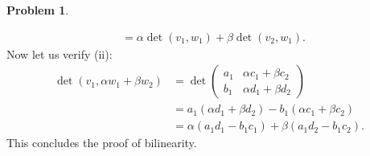 \documentclass[11pt,oneside]{amsart}
\theoremstyle{definition}
\newtheorem{problem}{Problem}
\begin{document}
\begin{problem}
\begin{enumerate}[(a)]
\begin{solution}
\[\begin{split}
                    &= \alpha\det(v_1,w_1)+\beta\det(v_2,w_1).
                \end{split}\]
                Now let us verify (ii):
                \[\begin{split}
                    \det(v_1,\alpha w_1+\beta w_2) &= \det\begin{pmatrix}
                        a_1 & \alpha c_1+\beta c_2\\
                        b_1 & \alpha d_1+\beta d_2
                    \end{pmatrix}\\
                    &= a_1(\alpha d_1+\beta d_2)-b_1(\alpha c_1+\beta c_2)\\
                    &= \alpha(a_1d_1-b_1c_1)+\beta(a_1d_2-b_1c_2).
                \end{split}\]
                This concludes the proof of bilinearity.
            \end{solution}
        \end{enumerate}
    \end{problem}
\end{document}

